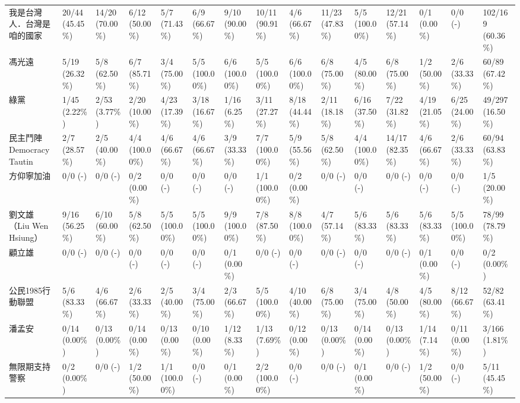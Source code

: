 \documentclass[letterpaper, 10pt, conference]{ieeeconf}   %
\begin{document}
\begin{CJK}{UTF8}{bsmi}
\begin{landscape}
\begin{longtable}[c]{@{}L{2.45cm}L{1.1cm}L{1.1cm}L{1.1cm}L{1.1cm}L{1.1cm}L{1.1cm}L{1.1cm}L{1.1cm}L{1.1cm}L{1.1cm}L{1.1cm}L{1.1cm}L{1.1cm}L{1.1cm}@{}}
我是台灣人．台灣是咱的國家 & 20/44 (45.45\%) & 14/20 (70.00\%) & 6/12 (50.00\%) & 5/7 (71.43\%) & 6/9 (66.67\%) & 9/10 (90.00\%) & 10/11 (90.91\%) & 4/6 (66.67\%) & 11/23 (47.83\%) & 5/5 (100.00\%) & 12/21 (57.14\%) & 0/1 (0.00\%) & 0/0 (-) & 102/169 (60.36\%) \\
馮光遠 & 5/19 (26.32\%) & 5/8 (62.50\%) & 6/7 (85.71\%) & 3/4 (75.00\%) & 5/5 (100.00\%) & 6/6 (100.00\%) & 5/5 (100.00\%) & 6/6 (100.00\%) & 6/8 (75.00\%) & 4/5 (80.00\%) & 6/8 (75.00\%) & 1/2 (50.00\%) & 2/6 (33.33\%) & 60/89 (67.42\%) \\
綠黨 & 1/45 (2.22\%) & 2/53 (3.77\%) & 2/20 (10.00\%) & 4/23 (17.39\%) & 3/18 (16.67\%) & 1/16 (6.25\%) & 3/11 (27.27\%) & 8/18 (44.44\%) & 2/11 (18.18\%) & 6/16 (37.50\%) & 7/22 (31.82\%) & 4/19 (21.05\%) & 6/25 (24.00\%) & 49/297 (16.50\%) \\
民主鬥陣 Democracy Tautin & 2/7 (28.57\%) & 2/5 (40.00\%) & 4/4 (100.00\%) & 4/6 (66.67\%) & 4/6 (66.67\%) & 3/9 (33.33\%) & 7/7 (100.00\%) & 5/9 (55.56\%) & 5/8 (62.50\%) & 4/4 (100.00\%) & 14/17 (82.35\%) & 4/6 (66.67\%) & 2/6 (33.33\%) & 60/94 (63.83\%) \\
方仰寧加油 & 0/0 (-) & 0/0 (-) & 0/2 (0.00\%) & 0/0 (-) & 0/0 (-) & 0/0 (-) & 1/1 (100.00\%) & 0/2 (0.00\%) & 0/0 (-) & 0/0 (-) & 0/0 (-) & 0/0 (-) & 0/0 (-) & 1/5 (20.00\%) \\
劉文雄（Liu Wen Hsiung） & 9/16 (56.25\%) & 6/10 (60.00\%) & 5/8 (62.50\%) & 5/5 (100.00\%) & 5/5 (100.00\%) & 9/9 (100.00\%) & 7/8 (87.50\%) & 8/8 (100.00\%) & 4/7 (57.14\%) & 5/6 (83.33\%) & 5/6 (83.33\%) & 5/6 (83.33\%) & 5/5 (100.00\%) & 78/99 (78.79\%) \\
顧立雄 & 0/0 (-) & 0/0 (-) & 0/0 (-) & 0/0 (-) & 0/0 (-) & 0/1 (0.00\%) & 0/0 (-) & 0/0 (-) & 0/0 (-) & 0/0 (-) & 0/0 (-) & 0/1 (0.00\%) & 0/0 (-) & 0/2 (0.00\%) \\
公民1985行動聯盟 & 5/6 (83.33\%) & 4/6 (66.67\%) & 2/6 (33.33\%) & 2/5 (40.00\%) & 3/4 (75.00\%) & 2/3 (66.67\%) & 5/5 (100.00\%) & 4/10 (40.00\%) & 6/8 (75.00\%) & 3/4 (75.00\%) & 4/8 (50.00\%) & 4/5 (80.00\%) & 8/12 (66.67\%) & 52/82 (63.41\%) \\
潘孟安 & 0/14 (0.00\%) & 0/13 (0.00\%) & 0/14 (0.00\%) & 0/13 (0.00\%) & 0/10 (0.00\%) & 1/12 (8.33\%) & 1/13 (7.69\%) & 0/12 (0.00\%) & 0/13 (0.00\%) & 0/14 (0.00\%) & 0/13 (0.00\%) & 1/14 (7.14\%) & 0/11 (0.00\%) & 3/166 (1.81\%) \\
無限期支持警察 & 0/2 (0.00\%) & 0/0 (-) & 1/2 (50.00\%) & 1/1 (100.00\%) & 0/0 (-) & 0/1 (0.00\%) & 2/2 (100.00\%) & 0/0 (-) & 0/0 (-) & 0/1 (0.00\%) & 0/0 (-) & 1/2 (50.00\%) & 0/0 (-) & 5/11 (45.45\%) \\

\end{longtable}
\end{landscape}
\end{CJK}
\end{document}
